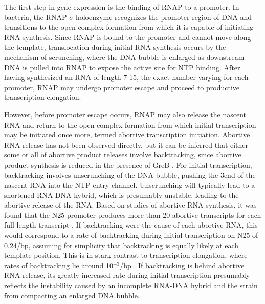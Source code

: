 %
The first step in gene expression is the binding of RNAP to a promoter. In
bacteria, the RNAP-$\sigma$ holoenzyme recognizes the promoter region of DNA
and transitions to the open complex formation from which it is capable of
initiating RNA synthesis. Since RNAP is bound to the promoter and cannot move
along the template, translocation during initial RNA synthesis occurs by the
mechanism of scrunching, where the DNA bubble is enlarged as downstream DNA is
pulled into RNAP to expose the active site for NTP binding. After having
synthesized an RNA of length 7-15, the exact number varying for each promoter,
RNAP may undergo promoter escape and proceed to productive transcription
elongation.

However, before promoter escape occurs, RNAP may also release the
nascent RNA and return to the open complex formation from which initial
transcription may be initiated once more, termed abortive
transcription initiation. Abortive RNA release has not been observed directly,
but it can be inferred that either some or all of abortive product releases
involve backtracking, since abortive product synthesis is reduced in the
presence of GreB
\cite{hsu_escherichia_1995,feng_grea-induced_1994,hsu_initial_2006}. For
initial transcription, backtracking involves unscrunching of the DNA bubble,
pushing the 3\ppp end of the nascent RNA into the NTP entry channel.
Unscrunching will typically lead to a shortened RNA-DNA hybrid, which is
presumably unstable, leading to the abortive release of the RNA. Based on
studies of abortive RNA synthesis, it was found that the N25 promoter produces
more than 20 abortive transcripts for each full length transcript
\cite{hsu_initial_2006}. If backtracking were the cause of each abortive RNA,
this would correspond to a rate of backtracking during initial transcription
on N25 of 0.24/bp, assuming for simplicity that backtracking is equally
likely at each template position. This is in stark contrast to transcription
elongation, where rates of backtracking lie around 10$^{-3}$/bp
\cite{shaevitz_backtracking_2003}. If backtracking is behind abortive RNA
release, its greatly increased rate during initial transcription presumably
reflects the instability caused by an incomplete RNA-DNA hybrid and the strain
from compacting an enlarged DNA bubble.

